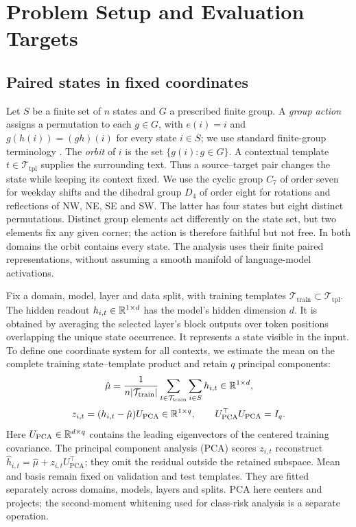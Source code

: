\section{Problem Setup and Evaluation Targets}
\label{sec:setup}
\subsection{Paired states in fixed coordinates}
Let $S$ be a finite set of $n$ states and $G$ a prescribed finite group. A \emph{group action} assigns a permutation to each $g\in G$, with $e(i)=i$ and $g(h(i))=(gh)(i)$ for every state $i\in S$; we use standard finite-group terminology \citep{serre1977linear}. The \emph{orbit} of $i$ is the set $\{g(i):g\in G\}$. A contextual template $t\in\mathcal T_{\mathrm{tpl}}$ supplies the surrounding text. Thus a source--target pair changes the state while keeping its context fixed. We use the cyclic group $C_7$ of order seven for weekday shifts and the dihedral group $D_4$ of order eight for rotations and reflections of NW, NE, SE and SW. The latter has four states but eight distinct permutations. Distinct group elements act differently on the state set, but two elements fix any given corner; the action is therefore faithful but not free. In both domains the orbit contains every state. The analysis uses their finite paired representations, without assuming a smooth manifold of language-model activations.

Fix a domain, model, layer and data split, with training templates $\mathcal T_{\mathrm{train}}\subset\mathcal T_{\mathrm{tpl}}$. The hidden readout $h_{i,t}\in\mathbb{R}^{1\times d}$ has the model's hidden dimension $d$. It is obtained by averaging the selected layer's block outputs over token positions overlapping the unique state occurrence. It represents a state visible in the input. To define one coordinate system for all contexts, we estimate the mean on the complete training state--template product and retain $q$ principal components:
\[
 \hat\mu=\frac{1}{n|\mathcal T_{\mathrm{train}}|}
 \sum_{t\in\mathcal T_{\mathrm{train}}}\sum_{i\in S}h_{i,t}
 \in\mathbb{R}^{1\times d},
\]
\begin{equation}
 z_{i,t}=(h_{i,t}-\hat\mu)U_{\mathrm{PCA}}\in\mathbb{R}^{1\times q},
 \qquad U_{\mathrm{PCA}}^\top U_{\mathrm{PCA}}=I_q.
 \label{eq:projection}
\end{equation}
Here $U_{\mathrm{PCA}}\in\mathbb{R}^{d\times q}$ contains the leading eigenvectors of the centered training covariance. The principal component analysis (PCA) scores $z_{i,t}$ reconstruct $\hat h_{i,t}=\hat\mu+z_{i,t}U_{\mathrm{PCA}}^\top$; they omit the residual outside the retained subspace. Mean and basis remain fixed on validation and test templates. They are fitted separately across domains, models, layers and splits. PCA here centers and projects; the second-moment whitening used for class-risk analysis is a separate operation.

